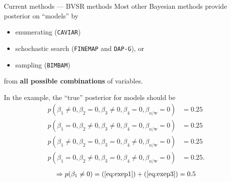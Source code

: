 \documentclass[10pt]{beamer}
\begin{document}
\begin{frame}{Current methods --- \normalsize BVSR methods}
    Most other Bayesian methods provide posterior on ``models'' by 
    \begin{itemize}
        \item enumerating (\texttt{CAVIAR})
        \item schochastic search (\texttt{FINEMAP} and \texttt{DAP-G}), or
        \item sampling (\texttt{BIMBAM})
    \end{itemize}
    from \textbf{all possible combinations} of variables. 
    
    In the example, the ``true'' posterior for models should be
    \begin{align}
        p(\beta_1 \ne 0, \beta_2 = 0, \beta_3 \ne 0, \beta_4 = 0, \beta_\text{o/w} = 0) &= 0.25 \label{eq:exep1} \\
        p(\beta_1 = 0, \beta_2 \ne 0, \beta_3 \ne 0, \beta_4 = 0, \beta_\text{o/w} = 0) &= 0.25 \\
        p(\beta_1 \ne 0, \beta_2 = 0, \beta_3 = 0, \beta_4 \ne 0, \beta_\text{o/w} = 0) &= 0.25 \label{eq:exep3}\\
        p(\beta_1 = 0, \beta_2 \ne 0, \beta_3 = 0, \beta_4 \ne 0, \beta_\text{o/w} = 0) &= 0.25.
    \end{align}
    \begin{gather}
        \implies p(\beta_1\ne 0) = (\ref{eq:exep1}) + (\ref{eq:exep3}) = 0.5
    \end{gather}
    
\end{frame}


\end{document}
